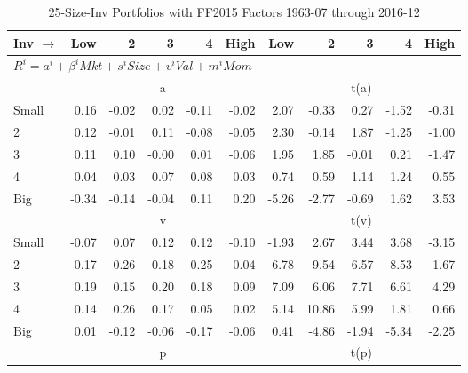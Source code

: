 
\begin{table}[!ht]
\centering
\caption{25-Size-Inv Portfolios with FF2015 Factors 1963-07 through 2016-12}
\begin{tabular}{lrrrrrrrrrr}
  \toprule
    Inv $\rightarrow$ & Low & 2 & 3 & 4 & High & Low & 2 & 3 & 4 & High \\ 
  \midrule
  \multicolumn{11}{l}{$R^i=a^i+\beta^iMkt+s^iSize+v^iVal+m^iMom$} \\

  
    
      & \multicolumn{5}{c}{a} & \multicolumn{5}{c}{t(a)}
    
    \\
      \cmidrule(r){2-6} \cmidrule(r){7-11}

    Small   & 0.16  & -0.02  & 0.02  & -0.11  & -0.02  & 2.07  & -0.33  & 0.27  & -1.52  & -0.31  \\
         2  & 0.12  & -0.01  & 0.11  & -0.08  & -0.05  & 2.30  & -0.14  & 1.87  & -1.25  & -1.00  \\
         3  & 0.11  & 0.10  & -0.00  & 0.01  & -0.06  & 1.95  & 1.85  & -0.01  & 0.21  & -1.47  \\
         4  & 0.04  & 0.03  & 0.07  & 0.08  & 0.03  & 0.74  & 0.59  & 1.14  & 1.24  & 0.55  \\
    Big     & -0.34  & -0.14  & -0.04  & 0.11  & 0.20  & -5.26  & -2.77  & -0.69  & 1.62  & 3.53  \\

  
    
      & \multicolumn{5}{c}{v} & \multicolumn{5}{c}{t(v)}
    
    \\
      \cmidrule(r){2-6} \cmidrule(r){7-11}

    Small   & -0.07  & 0.07  & 0.12  & 0.12  & -0.10  & -1.93  & 2.67  & 3.44  & 3.68  & -3.15  \\
         2  & 0.17  & 0.26  & 0.18  & 0.25  & -0.04  & 6.78  & 9.54  & 6.57  & 8.53  & -1.67  \\
         3  & 0.19  & 0.15  & 0.20  & 0.18  & 0.09  & 7.09  & 6.06  & 7.71  & 6.61  & 4.29  \\
         4  & 0.14  & 0.26  & 0.17  & 0.05  & 0.02  & 5.14  & 10.86  & 5.99  & 1.81  & 0.66  \\
    Big     & 0.01  & -0.12  & -0.06  & -0.17  & -0.06  & 0.41  & -4.86  & -1.94  & -5.34  & -2.25  \\

  
    
      & \multicolumn{5}{c}{p} & \multicolumn{5}{c}{t(p)}
    

\end{tabular}
\end{table}
